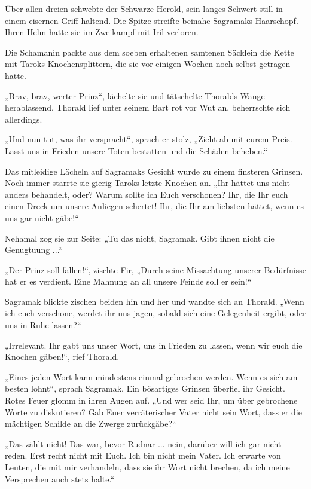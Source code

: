 Über allen dreien schwebte der Schwarze Herold, sein langes Schwert still in einem eisernen Griff haltend. Die Spitze streifte beinahe Sagramaks Haarschopf. Ihren Helm hatte sie im Zweikampf mit Iril verloren.

Die Schamanin packte aus dem soeben erhaltenen samtenen Säcklein die Kette mit Taroks Knochensplittern, die sie vor einigen Wochen noch selbst getragen hatte.

„Brav, brav, werter Prinz“, lächelte sie und tätschelte Thoralds Wange herablassend. Thorald lief unter seinem Bart rot vor Wut an, beherrschte sich allerdings.

„Und nun tut, was ihr verspracht“, sprach er stolz, „Zieht ab mit eurem Preis. Lasst uns in Frieden unsere Toten bestatten und die Schäden beheben.“

Das mitleidige Lächeln auf Sagramaks Gesicht wurde zu einem finsteren Grinsen. Noch immer starrte sie gierig Taroks letzte Knochen an. „Ihr hättet uns nicht anders behandelt, oder? Warum sollte ich Euch verschonen? Ihr, die Ihr euch einen Dreck um unsere Anliegen schertet! Ihr, die Ihr am liebsten hättet, wenn es uns gar nicht gäbe!“

Nehamal zog sie zur Seite: „Tu das nicht, Sagramak. Gibt ihnen nicht die Genugtuung ...“

„Der Prinz soll fallen!“, zischte Fir, „Durch seine Missachtung unserer Bedürfnisse hat er es verdient. Eine Mahnung an all unsere Feinde soll er sein!“

Sagramak blickte zischen beiden hin und her und wandte sich an Thorald. „Wenn ich euch verschone, werdet ihr uns jagen, sobald sich eine Gelegenheit ergibt, oder uns in Ruhe lassen?“

„Irrelevant. Ihr gabt uns unser Wort, uns in Frieden zu lassen, wenn wir euch die Knochen gäben!“, rief Thorald.

„Eines jeden Wort kann mindestens einmal gebrochen werden. Wenn es sich am besten lohnt“, sprach Sagramak. Ein bösartiges Grinsen überfiel ihr Gesicht. Rotes Feuer glomm in ihren Augen auf. „Und wer seid Ihr, um über gebrochene Worte zu diskutieren? Gab Euer verräterischer Vater nicht sein Wort, dass er die mächtigen Schilde an die Zwerge zurückgäbe?“

„Das zählt nicht! Das war, bevor Rudnar ... nein, darüber will ich gar nicht reden. Erst recht nicht mit Euch. Ich bin nicht mein Vater. Ich erwarte von Leuten, die mit mir verhandeln, dass sie ihr Wort nicht brechen, da ich meine Versprechen auch stets halte.“

